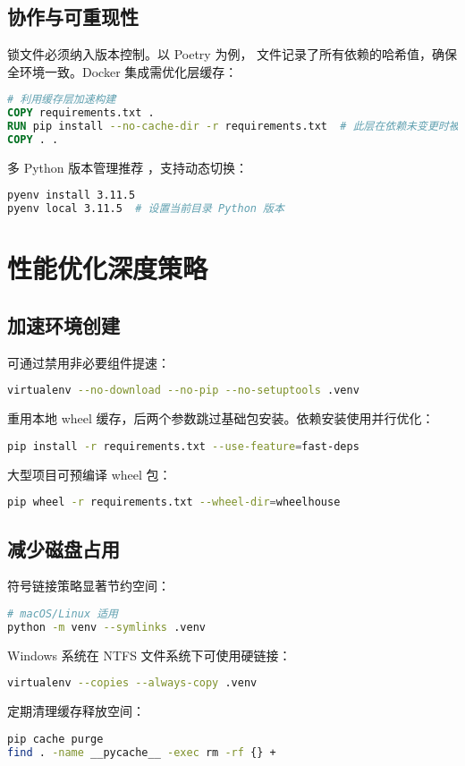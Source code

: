 \section{协作与可重现性}
锁文件必须纳入版本控制。以 Poetry 为例， 文件记录了所有依赖的哈希值，确保全环境一致。Docker 集成需优化层缓存：\par
\begin{lstlisting}[language=dockerfile]
# 利用缓存层加速构建
COPY requirements.txt .
RUN pip install --no-cache-dir -r requirements.txt  # 此层在依赖未变更时被复用
COPY . .
\end{lstlisting}
多 Python 版本管理推荐 ，支持动态切换：\par
\begin{lstlisting}[language=bash]
pyenv install 3.11.5
pyenv local 3.11.5  # 设置当前目录 Python 版本
\end{lstlisting}
\chapter{性能优化深度策略}
\section{加速环境创建}
 可通过禁用非必要组件提速：\par
\begin{lstlisting}[language=bash]
virtualenv --no-download --no-pip --no-setuptools .venv
\end{lstlisting}
 重用本地 wheel 缓存，后两个参数跳过基础包安装。依赖安装使用并行优化：\par
\begin{lstlisting}[language=bash]
pip install -r requirements.txt --use-feature=fast-deps
\end{lstlisting}
大型项目可预编译 wheel 包：\par
\begin{lstlisting}[language=bash]
pip wheel -r requirements.txt --wheel-dir=wheelhouse
\end{lstlisting}
\section{减少磁盘占用}
符号链接策略显著节约空间：\par
\begin{lstlisting}[language=bash]
# macOS/Linux 适用
python -m venv --symlinks .venv
\end{lstlisting}
Windows 系统在 NTFS 文件系统下可使用硬链接：\par
\begin{lstlisting}[language=bash]
virtualenv --copies --always-copy .venv
\end{lstlisting}
定期清理缓存释放空间：\par
\begin{lstlisting}[language=bash]
pip cache purge
find . -name __pycache__ -exec rm -rf {} +
\end{lstlisting}
